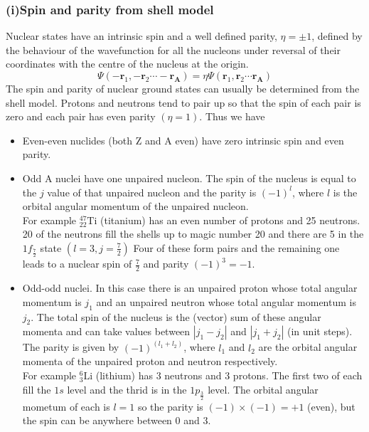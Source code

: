 \subsubsection{(i)Spin and parity from shell model}
Nuclear states have an intrinsic spin and a well defined parity, $\eta=\pm 1$, defined by the behaviour of the wavefunction for all the nucleons under reversal of their coordinates with the centre of the nucleus at the origin.
$$
\Psi\left(-\mathbf{r}_{1},-\mathbf{r}_{2} \cdots-\mathbf{r}_{\mathbf{A}}\right)=\eta \Psi\left(\mathbf{r}_{1}, \mathbf{r}_{2} \cdots \mathbf{r}_{\mathbf{A}}\right)
$$
The spin and parity of nuclear ground states can usually be determined from the shell model. Protons and neutrons tend to pair up so that the spin of each pair is zero and each pair has even parity $(\eta=1)$. Thus we have
\begin{itemize}
	\item Even-even nuclides (both $\mathrm{Z}$ and $\mathrm{A}$ even) have zero intrinsic spin and even parity.
	\item Odd A nuclei have one unpaired nucleon. The spin of the nucleus is equal to the $j$ value of that unpaired nucleon and the parity is $(-1)^{l}$, where $l$ is the orbital angular momentum of the unpaired nucleon.\\
	For example ${ }_{22}^{47} \mathrm{Ti}$ (titanium) has an even number of protons and 25 neutrons. 20 of the neutrons fill the shells up to magic number 20 and there are 5 in the $1 f_{\frac{7}{2}}$ state $\left(l=3, j=\frac{7}{2}\right)$ Four of these form pairs and the remaining one leads to a nuclear spin of $\frac{7}{2}$ and parity $(-1)^{3}=-1$.
	\item Odd-odd nuclei. In this case there is an unpaired proton whose total angular momentum is $j_{1}$ and an unpaired neutron whose total angular momentum is $j_{2}$. The total spin of the nucleus is the (vector) sum of these angular momenta and can take values between $\left|j_{1}-j_{2}\right|$ and $\left|j_{1}+j_{2}\right|$ (in unit steps). The parity is given by $(-1)^{\left(l_{1}+l_{2}\right)}$, where $l_{1}$ and $l_{2}$ are the orbital angular momenta of the unpaired proton and neutron respectively.\\
	For example ${ }_{3}^{6} \mathrm{Li}$ (lithium) has 3 neutrons and 3 protons. The first two of each fill the $1 s$ level and the thrid is in the $1 p_{\frac{3}{2}}$ level. The orbital angular mometum of each is $l=1$ so the parity is $(-1) \times(-1)=+1$ (even), but the spin can be anywhere between 0 and $3 .$
\end{itemize}
